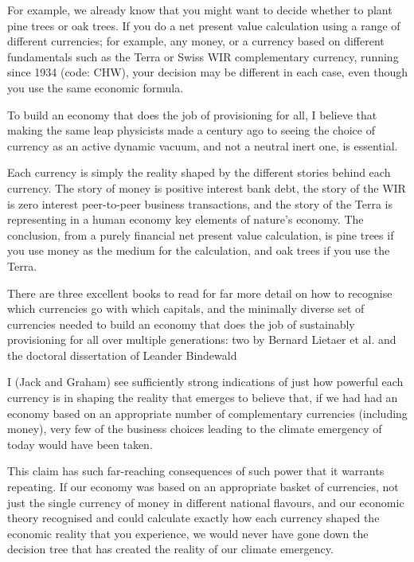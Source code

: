 For example, we already know that you might want to decide whether to plant pine trees or oak trees. If you do a net present value calculation using a range of different currencies; for example, any money, or a currency based on different fundamentals such as the Terra or Swiss WIR complementary currency, running since 1934 (code: CHW), your decision may be different in each case, even though you use the same economic formula.


To build an economy that does the job of provisioning for all, I believe that making the same leap physicists made a century ago to seeing the choice of currency as an active dynamic vacuum, and not a neutral inert one, is essential. 


Each currency is simply the reality shaped by the different stories behind each currency. The story of money is positive interest bank debt, the story of the WIR is zero interest peer-to-peer business transactions, and the story of the Terra is representing in a human economy key elements of nature's economy. The conclusion, from a purely financial net present value calculation, is pine trees if you use money as the medium for the calculation, and oak trees if you use the Terra.


There are three excellent books to read for far more detail on how to recognise which currencies go with which capitals, and the minimally diverse set of currencies needed to build an economy that does the job of sustainably provisioning for all over multiple generations: two by Bernard Lietaer et al.\cite{lietaer-money-and-sustainability,lietaer-rethinking} and the doctoral dissertation of Leander Bindewald\cite{leander-phd}


I (Jack and Graham) see sufficiently strong indications of just how powerful each currency is in shaping the reality that emerges to believe that, if we had had an economy based on an appropriate number of complementary currencies (including money), very few of the business choices leading to the climate emergency of today would have been taken. 


This claim has such far-reaching consequences of such power that it warrants repeating. If our economy was based on an appropriate basket of currencies, not just the single currency of money in different national flavours, and our economic theory recognised and could calculate exactly how each currency shaped the economic reality that you experience, we would never have gone down the decision tree that has created the reality of our climate emergency.


